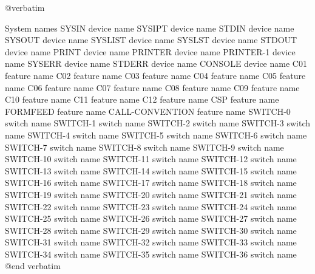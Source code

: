 @verbatim

System names
SYSIN                           device name
SYSIPT                          device name
STDIN                           device name
SYSOUT                          device name
SYSLIST                         device name
SYSLST                          device name
STDOUT                          device name
PRINT                           device name
PRINTER                         device name
PRINTER-1                       device name
SYSERR                          device name
STDERR                          device name
CONSOLE                         device name
C01                             feature name
C02                             feature name
C03                             feature name
C04                             feature name
C05                             feature name
C06                             feature name
C07                             feature name
C08                             feature name
C09                             feature name
C10                             feature name
C11                             feature name
C12                             feature name
CSP                             feature name
FORMFEED                        feature name
CALL-CONVENTION                 feature name
SWITCH-0                        switch name
SWITCH-1                        switch name
SWITCH-2                        switch name
SWITCH-3                        switch name
SWITCH-4                        switch name
SWITCH-5                        switch name
SWITCH-6                        switch name
SWITCH-7                        switch name
SWITCH-8                        switch name
SWITCH-9                        switch name
SWITCH-10                       switch name
SWITCH-11                       switch name
SWITCH-12                       switch name
SWITCH-13                       switch name
SWITCH-14                       switch name
SWITCH-15                       switch name
SWITCH-16                       switch name
SWITCH-17                       switch name
SWITCH-18                       switch name
SWITCH-19                       switch name
SWITCH-20                       switch name
SWITCH-21                       switch name
SWITCH-22                       switch name
SWITCH-23                       switch name
SWITCH-24                       switch name
SWITCH-25                       switch name
SWITCH-26                       switch name
SWITCH-27                       switch name
SWITCH-28                       switch name
SWITCH-29                       switch name
SWITCH-30                       switch name
SWITCH-31                       switch name
SWITCH-32                       switch name
SWITCH-33                       switch name
SWITCH-34                       switch name
SWITCH-35                       switch name
SWITCH-36                       switch name
@end verbatim
